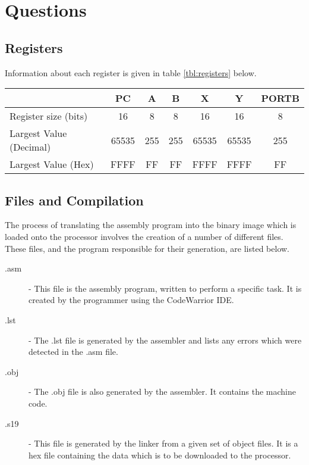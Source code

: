\cleardoublepage

\section{Questions}

\subsection{Registers}

Information about each register is given in table \ref{tbl:registers} below.

\begin{table*}[hp]
	\centering
	\caption{Register}
	\label{tbl:registers}
	\vspace{6pt}
	\begin{tabular}{lcccccc}
		\toprule
		 & PC & A & B & X & Y & PORTB \\
		\midrule
		Register size (bits) & 16 & 8 & 8 & 16 & 16 & 8 \\
		Largest Value (Decimal) & 65535 & 255 & 255 & 65535 & 65535 & 255 \\
		Largest Value (Hex) & FFFF & FF & FF & FFFF & FFFF & FF \\
		\bottomrule
	\end{tabular}
\end{table*}

\subsection{Files and Compilation}

The process of translating the assembly program into the binary image which is loaded onto the processor involves the creation of a number of different files.
These files, and the program responsible for their generation, are listed below.

\begin{description}

\item[.asm] - 
This file is the assembly program, written to perform a specific task.
It is created by the programmer using the CodeWarrior IDE.

\item[.lst] -
The .lst file is generated by the assembler and lists any errors which were detected in the .asm file.

\item[.obj] - 
The .obj file is also generated by the assembler. 
It contains the machine code.

\item[.s19] -
This file is generated by the linker from a given set of object files.
It is a hex file containing the data which is to be downloaded to the processor.

\end{description}